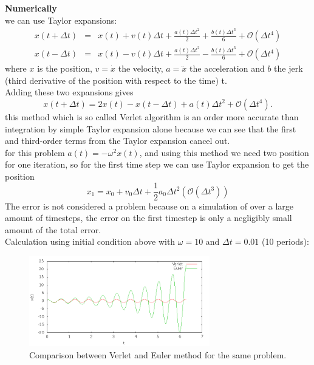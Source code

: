 \documentclass[paper=a4, fontsize=11pt]{scrartcl}
\numberwithin{equation}{section} %
\numberwithin{figure}{section} %
\numberwithin{table}{section} %
\begin{document}
\textbf{Numerically}\\
we can use Taylor expansions:
\begin{eqnarray*}
x(t + \Delta t) &=& x(t) + v(t)\Delta t + \frac{a(t) \Delta t^2}{2} + \frac{b(t) \Delta t^3}{6} + \mathcal{O}(\Delta t^4)\\
x(t - \Delta t) &=& x(t) - v(t)\Delta t + \frac{a(t) \Delta t^2}{2} - \frac{b(t) \Delta t^3}{6} + \mathcal{O}(\Delta t^4)
\end{eqnarray*}
where $x$ is the position, $v = \dot{x}$ the velocity, $a = \ddot{x}$ the acceleration and $b$ the jerk (third derivative of the position with respect to the time) t.\\
Adding these two expansions gives
\begin{equation*}
x(t + \Delta t) = 2x(t) - x(t - \Delta t) + a(t)\Delta t^2 + \mathcal{O}(\Delta t^4).
\end{equation*}
this method which is so called Verlet algorithm is an order more accurate than integration by simple Taylor expansion alone because we can see that the first and third-order terms from the Taylor expansion cancel out.\\
for this problem $a(t) = -\omega^2 x(t)$, and using this method we need two position for one iteration, so for the first time step we can use Taylor expansion to get the position
\begin{equation*}
x_1 = x_0 + v_0 \Delta t + \frac{1}{2} a_0 \Delta t^2 (\mathcal{O}(\Delta t^3))
\end{equation*}
The error is not considered a problem because on a simulation of over a large amount of timesteps, the error on the first timestep is only a negligibly small amount of the total error.\\

Calculation using initial condition above with $\omega = 10$ and $\Delta t = 0.01$ (10 periods):
\begin{figure}
	\centering
	\includegraphics[width=0.7\textwidth]{verlet.png}
	\caption{Comparison between Verlet and Euler method for the same problem.}
\end{figure}
\end{document}
